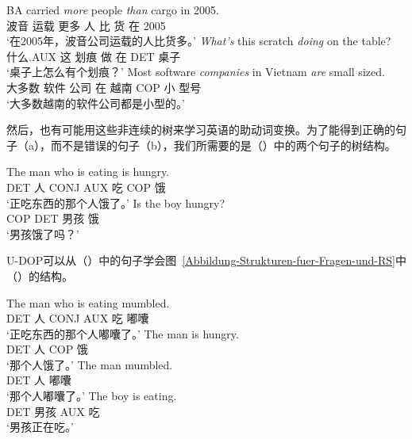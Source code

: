 \eal
\ex 
\gll BA carried \emph{more} people \emph{than} cargo in 2005.\\
波音 运载 更多 人 比 货 在 2005\\
\glt `在2005年，波音公司运载的人比货多。'
\ex 
\gll \emph{What's} this scratch \emph{doing} on the table?\\
什么.AUX 这 划痕 做 在 DET 桌子\\
\glt `桌子上怎么有个划痕？'
\ex 
\gll Most software \emph{companies} in Vietnam \emph{are} small sized.\\
大多数 软件 公司 在 越南 COP 小 型号\\
\glt `大多数越南的软件公司都是小型的。'
\zl

\noindent
然后，也有可能用这些非连续的树来学习英语的助动词变换。为了能得到正确的句子（a），而不是错误的句子（b），我们所需要的是（）中的两个句子的树结构。

\eal
\label{Beispiel-Inversion}
\ex 
\gll The man who is eating is hungry.\\
DET 人 CONJ AUX 吃 COP 饿\\
\glt `正吃东西的那个人饿了。'
\ex 
\gll Is the boy hungry?\\
COP DET 男孩 饿\\
\glt `男孩饿了吗？'
\zl

\eal
{}
\zl

\noindent
U-DOP可以从（）中的句子学会图~\vref{Abbildung-Strukturen-fuer-Fragen-und-RS}中（）的结构。

\eal
\label{Hilfsverbinversion-Input}
\ex\label{Bsp-The-man-who-is-eatin-mumbled}
\gll The man who is eating mumbled.\\
DET 人 CONJ AUX 吃 嘟囔\\
\glt `正吃东西的那个人嘟囔了。'
\ex \gll The man is hungry.\\
DET 人 COP  饿\\
\glt `那个人饿了。'
\ex \gll The man mumbled.\\
DET 人 嘟囔\\
\glt `那个人嘟囔了。'
\ex \gll The boy is eating.\\
DET 男孩 AUX 吃\\
\glt `男孩正在吃。'
\zl

